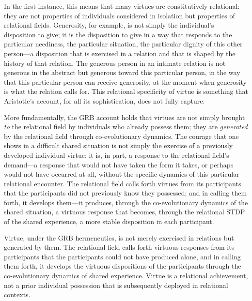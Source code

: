 In the first instance, this means that many virtues are constitutively relational: they are not properties of individuals considered in isolation but properties of relational fields. Generosity, for example, is not simply the individual's disposition to give; it is the disposition to give in a way that responds to the particular neediness, the particular situation, the particular dignity of this other person---a disposition that is exercised in a relation and that is shaped by the history of that relation. The generous person in an intimate relation is not generous in the abstract but generous toward this particular person, in the way that this particular person can receive generosity, at the moment when generosity is what the relation calls for. This relational specificity of virtue is something that Aristotle's account, for all its sophistication, does not fully capture.

More fundamentally, the GRB account holds that virtues are not simply brought \emph{to} the relational field by individuals who already possess them; they are \emph{generated} by the relational field through co-evolutionary dynamics. The courage that one shows in a difficult shared situation is not simply the exercise of a previously developed individual virtue; it is, in part, a response to the relational field's demand---a response that would not have taken the form it takes, or perhaps would not have occurred at all, without the specific dynamics of this particular relational encounter. The relational field calls forth virtues from its participants that the participants did not previously know they possessed; and in calling them forth, it develops them---it produces, through the co-evolutionary dynamics of the shared situation, a virtuous response that becomes, through the relational STDP of the shared experience, a more stable disposition in each participant.

\begin{claim}
Virtue, under the GRB hermeneutics, is not merely exercised in relations but generated by them. The relational field calls forth virtuous responses from its participants that the participants could not have produced alone, and in calling them forth, it develops the virtuous dispositions of the participants through the co-evolutionary dynamics of shared experience. Virtue is a relational achievement, not a prior individual possession that is subsequently deployed in relational contexts.
\end{claim}


